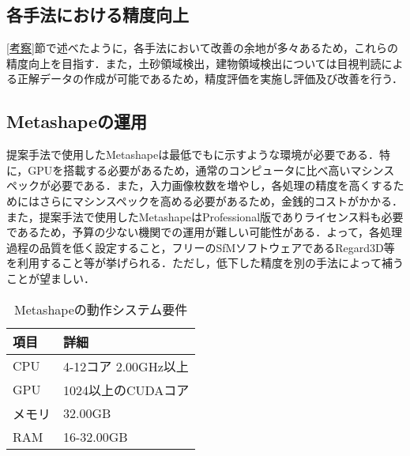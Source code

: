     \subsection*{各手法における精度向上}
      \ref{考察}節で述べたように，各手法において改善の余地が多々あるため，これらの精度向上を目指す．また，土砂領域検出，建物領域検出については目視判読による正解データの作成が可能であるため，精度評価を実施し評価及び改善を行う．


    \subsection*{Metashapeの運用}
      提案手法で使用したMetashapeは最低でもに示すような環境が必要である．特に，GPUを搭載する必要があるため，通常のコンピュータに比べ高いマシンスペックが必要である．また，入力画像枚数を増やし，各処理の精度を高くするためにはさらにマシンスペックを高める必要があるため，金銭的コストがかかる．また，提案手法で使用したMetashapeはProfessional版でありライセンス料も必要であるため，予算の少ない機関での運用が難しい可能性がある．よって，各処理過程の品質を低く設定すること，フリーのSfMソフトウェアであるRegard3D\cite{Regard3D}等を利用すること等が挙げられる．ただし，低下した精度を別の手法によって補うことが望ましい．
      
      \begin{table}[tbp]
        \centering
        \caption{Metashapeの動作システム要件}
        \label{Metashapeの動作システム要件}
        \begin{tabular}{ll}
          \hline
          \textbf{項目} & \textbf{詳細} \\
          \hline \hline
          CPU & 4-12コア 2.00GHz以上 \\
          GPU & 1024以上のCUDAコア \\
          メモリ & 32.00GB \\
          RAM & 16-32.00GB \\ \hline
        \end{tabular}
      \end{table}
